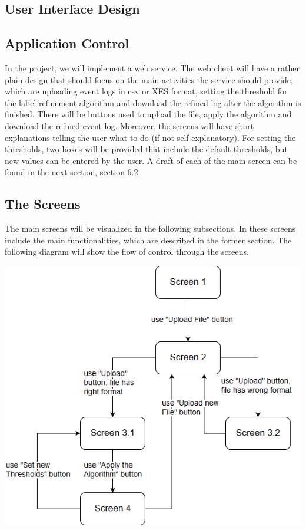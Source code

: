 \documentclass[notitlepage]{article}
\begin{document}
\begin{flushleft}
\section{User Interface Design}
\subsection{Application Control}

In the project, we will implement a web service. The web client will have a rather plain design that should focus on the main activities the service should provide, which are uploading event logs in csv or XES format, setting the threshold for the label refinement algorithm and download the refined log after the algorithm is finished. There will be buttons used to upload the file, apply the algorithm and download the refined event log. Moreover, the screens will have short explanations telling the user what to do (if not self-explanatory). For setting the thresholds, two boxes will be provided that include the default thresholds, but new values can be entered by the user. A draft of each of the main screen can be found in the next section, section 6.2.

\subsection{The Screens}

The main screens will be visualized in the following subsections. In these screens include the main functionalities, which are described in the former section. The following diagram will show the flow of control through the screens.  

\includegraphics[scale=0.7]{ScreenFlow.png}


\end{flushleft}
\end{document}
